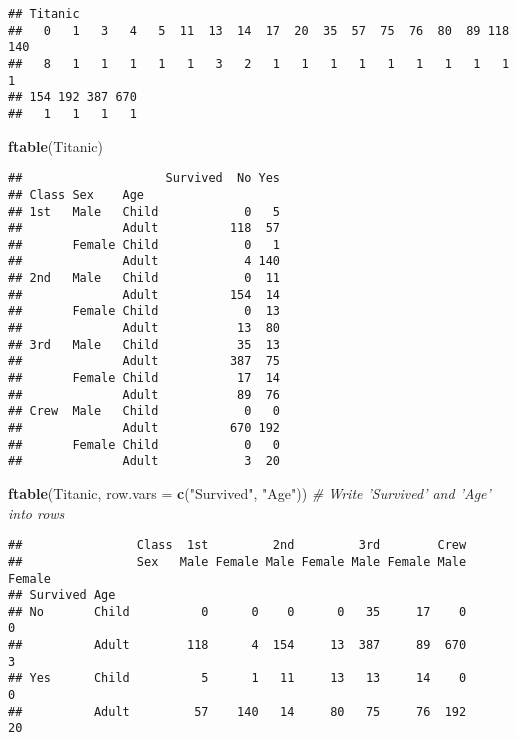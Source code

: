 \documentclass[]{article}
\newenvironment{Shaded}{\begin{snugshade}}{\end{snugshade}}
\newcommand{\KeywordTok}[1]{\textcolor[rgb]{0.13,0.29,0.53}{\textbf{#1}}}
\newcommand{\DataTypeTok}[1]{\textcolor[rgb]{0.13,0.29,0.53}{#1}}
\newcommand{\StringTok}[1]{\textcolor[rgb]{0.31,0.60,0.02}{#1}}
\newcommand{\CommentTok}[1]{\textcolor[rgb]{0.56,0.35,0.01}{\textit{#1}}}
\newcommand{\NormalTok}[1]{#1}
\begin{document}
\begin{verbatim}
## Titanic
##   0   1   3   4   5  11  13  14  17  20  35  57  75  76  80  89 118 140 
##   8   1   1   1   1   1   3   2   1   1   1   1   1   1   1   1   1   1 
## 154 192 387 670 
##   1   1   1   1
\end{verbatim}

\begin{Shaded}
\begin{Highlighting}[]
\KeywordTok{ftable}\NormalTok{(Titanic)}
\end{Highlighting}
\end{Shaded}

\begin{verbatim}
##                    Survived  No Yes
## Class Sex    Age                   
## 1st   Male   Child            0   5
##              Adult          118  57
##       Female Child            0   1
##              Adult            4 140
## 2nd   Male   Child            0  11
##              Adult          154  14
##       Female Child            0  13
##              Adult           13  80
## 3rd   Male   Child           35  13
##              Adult          387  75
##       Female Child           17  14
##              Adult           89  76
## Crew  Male   Child            0   0
##              Adult          670 192
##       Female Child            0   0
##              Adult            3  20
\end{verbatim}

\begin{Shaded}
\begin{Highlighting}[]
\KeywordTok{ftable}\NormalTok{(Titanic, }\DataTypeTok{row.vars =} \KeywordTok{c}\NormalTok{(}\StringTok{"Survived"}\NormalTok{, }\StringTok{"Age"}\NormalTok{))  }\CommentTok{# Write 'Survived' and 'Age' into rows}
\end{Highlighting}
\end{Shaded}

\begin{verbatim}
##                Class  1st         2nd         3rd        Crew       
##                Sex   Male Female Male Female Male Female Male Female
## Survived Age                                                        
## No       Child          0      0    0      0   35     17    0      0
##          Adult        118      4  154     13  387     89  670      3
## Yes      Child          5      1   11     13   13     14    0      0
##          Adult         57    140   14     80   75     76  192     20
\end{verbatim}
\end{document}
